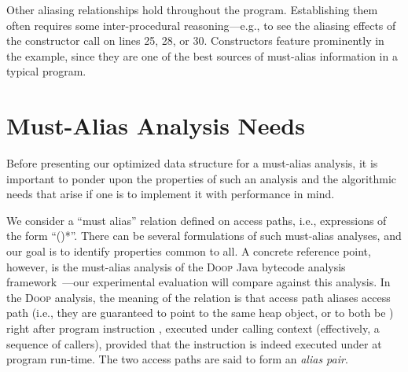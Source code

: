 Other aliasing relationships hold throughout the program. Establishing them
often requires some inter-procedural reasoning---e.g., to see the aliasing
effects of the constructor call on lines 25, 28, or 30. Constructors feature
prominently in the example, since they are one of the best sources of
must-alias information in a typical program.


\section{Must-Alias Analysis Needs}
\label{sec:needs}

Before presenting our optimized data structure for a must-alias analysis, it is
important to ponder upon the properties of such an analysis and the algorithmic
needs that arise if one is to implement it with performance in mind.


We consider a ``must alias'' relation defined on access paths, i.e.,
expressions of the form ``()*''. There can be several
formulations of such must-alias analyses, and our goal is to identify
properties common to all. A concrete reference point, however, is the
must-alias analysis of the \textsc{Doop} Java bytecode analysis
framework~\cite{soap/Balatsouras17}---our experimental evaluation will
compare against this analysis. In the \textsc{Doop} analysis, the
meaning of the  relation is that
access path  aliases access path  (i.e., they are
guaranteed to point to the same heap object, or to both be )
right after program instruction , executed under calling
context  (effectively, a sequence of callers), provided that
the instruction is indeed executed under  at program
run-time. The two access paths are said to form an \emph{alias pair}.


